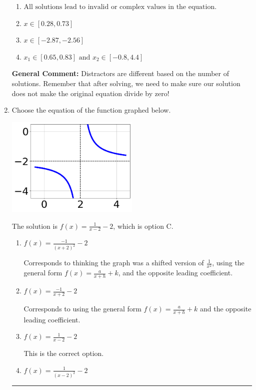 \documentclass{extbook}[14pt]
\newcommand{\litem}[1]{\item #1

\rule{\textwidth}{0.4pt}}
\begin{document}
\begin{enumerate}
{\begin{enumerate}[label=\Alph*.]
* $x = 0.784 \text{ and } x = -2.784$, which is the correct option.
\item \( \text{All solutions lead to invalid or complex values in the equation.} \)


\item \( x \in [0.28,0.73] \)


\item \( x \in [-2.87,-2.56] \)


\item \( x_1 \in [0.65, 0.83] \text{ and } x_2 \in [-0.8,4.4] \)


\end{enumerate}

\textbf{General Comment:} Distractors are different based on the number of solutions. Remember that after solving, we need to make sure our solution does not make the original equation divide by zero!
}
\litem{
Choose the equation of the function graphed below.

\begin{center}
    \includegraphics[width=0.5\textwidth]{../Figures/rationalGraphToEquationC.png}
\end{center}


The solution is \( f(x) = \frac{1}{x - 2} - 2 \), which is option C.\begin{enumerate}[label=\Alph*.]
\item \( f(x) = \frac{-1}{(x + 2)^2} - 2 \)

Corresponds to thinking the graph was a shifted version of $\frac{1}{x^2}$, using the general form $f(x) = \frac{a}{x+h}+k$, and the opposite leading coefficient.
\item \( f(x) = \frac{-1}{x + 2} - 2 \)

Corresponds to using the general form $f(x) = \frac{a}{x+h}+k$ and the opposite leading coefficient.
\item \( f(x) = \frac{1}{x - 2} - 2 \)

This is the correct option.
\item \( f(x) = \frac{1}{(x - 2)^2} - 2 \)


\end{enumerate}}
\end{enumerate}
\end{document}
